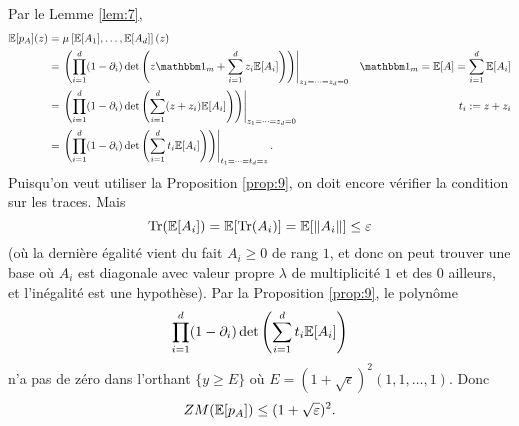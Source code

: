 \begin{preuve}[du Théorème 1]
  Par le Lemme \ref{lem:7}, 
  \begin{align*}
    \E[p_A](z)
    &= \mu \left[ \E[A_1], \ldots , \E[A_d] \right](z)\\
    &=\left . \left( \prod_{i=1}^{d} (1 - \partial_i)
      \det \left( z \un_m + \sum_{i=1}^{d}z_i \E[A_i] \right) \right) \right|_{z_1= \cdots = z_d = 0} & \un_m
                                                                                                        =
                                                                                                        \E[A]
                                                                                                        =
                                                                                                        \sum_{i=1}^{d}
    \E[A_i]\\
    &= \left . \left( \prod_{i=1}^{d} (1 - \partial_i)
      \det \left( \sum_{i=1}^{d}(z + z_i) \E[A_i] \right) \right) \right|_{z_1= \cdots = z_d = 0} & t_i := z +
                                                                                                    z_i\\
    &= \left . \left( \prod_{i=1}^{d} (1 - \partial_i)
      \det \left( \sum_{i=1}^{d}t_i \E[A_i] \right) \right) \right|_{t_1= \cdots = t_d = z}.
  \end{align*}
  Puisqu'on veut utiliser la Proposition \ref{prop:9}, on doit encore vérifier la condition sur les
  traces. Mais 
  \[ \mathrm{Tr}(\mathbb{E}[A_i]) = \mathbb{E}[\mathrm{Tr}(A_i)] = \mathbb{E}[\|A_i\|] \leq \varepsilon\]
  (où la dernière égalité vient du fait $A_i \geq 0$ de rang $1$, et donc on peut trouver une base où $A_i$
  est diagonale avec valeur propre $\lambda$ de multiplicité $1$ et des $0$ ailleurs, et l'inégalité est une
  hypothèse). Par la Proposition \ref{prop:9}, le polynôme 
  \[ \prod_{i=1}^{d} (1 - \partial_i) \det \left( \sum_{i=1}^{d} t_i \mathbb{E}[A_i] \right) \]
  n'a pas de zéro dans l'orthant $\{y \geq E\}$ où $E = (1 + \sqrt{\epsilon})^2(1, 1, \ldots , 1)$. Donc 
  \[ ZM(\mathbb{E}[p_A]) \leq (1 + \sqrt{\varepsilon})^2. \]
  
\end{preuve}






